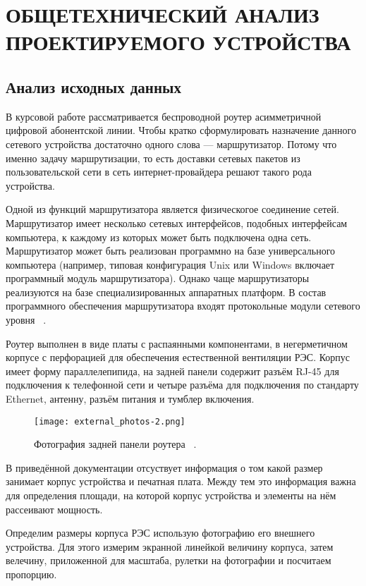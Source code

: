 \section{ОБЩЕТЕХНИЧЕСКИЙ АНАЛИЗ ПРОЕКТИРУЕМОГО УСТРОЙСТВА}
\subsection{Анализ исходных данных}

В курсовой работе рассматривается беспроводной роутер асимметричной
цифровой абонентской линии.  Чтобы кратко сформулировать назначение
данного сетевого устройства достаточно одного слова — маршрутизатор.
Потому что именно задачу маршрутизации, то есть доставки сетевых
пакетов из пользовательской сети в сеть интернет-провайдера решают
такого рода устройства.


Одной из функций маршрутизатора является физическогое соединение
сетей. Маршрутизатор имеет несколько сетевых интерфейсов, подобных
интерфейсам компьютера, к каждому из которых может быть подключена
одна сеть. Маршрутизатор может быть реализован программно на базе
универсального компьютера (например, типовая конфигурация Unix или
Windows включает программный модуль маршрутизатора). Однако чаще
маршрутизаторы реализуются на базе специализированных аппаратных
платформ. В состав программного обеспечения маршрутизатора входят
протокольные модули сетевого уровня ~\cite{NetworksOlifer2016}.

Роутер выполнен в виде платы с распаянными компонентами, в
негерметичном корпусе с перфорацией для обеспечения естественной
вентиляции РЭС. Корпус имеет форму параллелепипида, на задней панели
содержит разъём RJ-45 для подключения к телефонной сети и четыре
разъёма для подключения по стандарту Ethernet, антенну, разъём питания
и тумблер включения.

\begin{figure}[h] %
  \centering
\texttt{[image: external\_photos-2.png]}
\caption{Фотография задней панели роутера ~\cite{EXTERNAL-PHOTOS}.}

\end{figure}

В приведённой документации отсуствует информация о том какой размер
занимает корпус устройства и печатная плата.
Между тем это информация важна для определения площади,
на которой корпус устройства и элементы на нём рассеивают мощность.

Определим размеры корпуса РЭС использую фотографию его внешнего
устройства. Для этого измерим экранной линейкой величину корпуса,
затем велечину, приложенной для масштаба, рулетки на фотографии и
посчитаем пропорцию.


